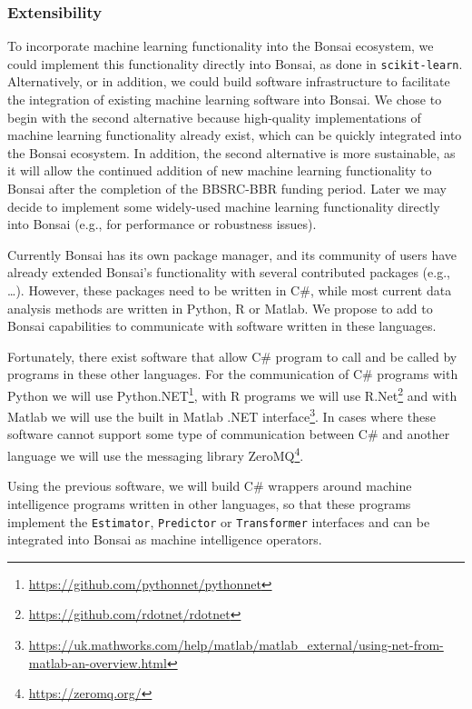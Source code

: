 \subsubsection{Extensibility}
\label{sec:extensibility}

To incorporate machine learning functionality into the Bonsai ecosystem, we
could
implement this functionality directly into Bonsai, as done in
\texttt{scikit-learn}. Alternatively, or in addition, we could build software
infrastructure to facilitate the integration of existing machine learning
software into Bonsai. We chose to begin with the second alternative because
high-quality implementations of machine learning functionality already exist,
which can be quickly integrated into the Bonsai ecosystem. In addition, the
second alternative is more sustainable, as it will allow the continued addition
of new machine learning functionality to Bonsai after the completion of the
BBSRC-BBR funding period. Later we may decide to implement some widely-used
machine learning functionality directly into Bonsai (e.g., for performance or
robustness issues).

Currently Bonsai has its own package manager, and its community of users have
already extended Bonsai's functionality with several contributed packages
(e.g., \ldots). However, these packages need to be written in C\#, while most
current data analysis methods are written in Python, R or Matlab. We propose to
add to Bonsai capabilities to communicate with software written in these
languages.

Fortunately, there exist software that allow C\# program
to call and be called by programs in these other languages. For the
communication of C\# programs with Python we will use
Python.NET\footnote{\href{https://github.com/pythonnet/pythonnet}{https://github.com/pythonnet/pythonnet}},
with R programs we will use
R.Net\footnote{\href{https://github.com/rdotnet/rdotnet}{https://github.com/rdotnet/rdotnet}}
and with Matlab we will use the built in Matlab .NET
interface\footnote{\href{https://uk.mathworks.com/help/matlab/matlab\_external/using-net-from-matlab-an-overview.html}{https://uk.mathworks.com/help/matlab/matlab\_external/using-net-from-matlab-an-overview.html}}.
In cases where these software cannot support some type of communication between
C\# and another language we will use the messaging library
ZeroMQ\footnote{\href{https://zeromq.org/}{https://zeromq.org/}}.

Using the previous software, we will build C\# wrappers around machine
intelligence programs written in other languages, so that these programs
implement the \texttt{Estimator}, \texttt{Predictor} or \texttt{Transformer}
interfaces and can be integrated into Bonsai as machine intelligence operators.

